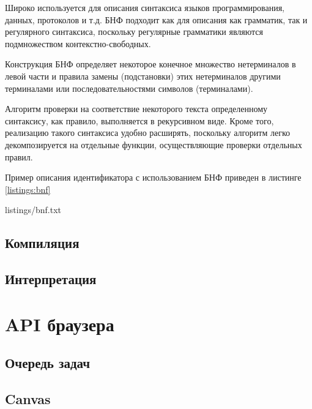 Широко используется для описания синтаксиса языков программирования, данных, протоколов и т.д. БНФ подходит как для описания как грамматик, так и регулярного синтаксиса, поскольку регулярные грамматики являются подмножеством контекстно-свободных.

Конструкция БНФ определяет некоторое конечное множество нетерминалов в левой части и правила замены (подстановки) этих нетерминалов другими терминалами или последовательностями символов (терминалами).

Алгоритм проверки на соответствие некоторого текста определенному синтаксису, как правило, выполняется в рекурсивном виде. Кроме того, реализацию такого синтаксиса удобно расширять, поскольку алгоритм легко декомпозируется на отдельные функции, осуществляющие проверки отдельных правил.

Пример описания идентификатора с использованием БНФ приведен в листинге \ref{listings:bnf}


{listings/bnf.txt}
\subsection{Компиляция}
\subsection{Интерпретация}
\section{API браузера}
\subsection{Очередь задач}
\subsection{Canvas}


